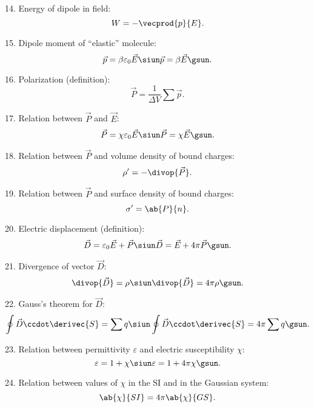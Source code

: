 14. Energy of dipole in field:
\begin{equation*}
	W = - \vecprod{p}{E}.
\end{equation*}

15. Dipole moment of ``elastic'' molecule:
\begin{equation*}
	\vec{p}=\beta\varepsilon_0\vec{E} \siun  \vec{p}=\beta\vec{E} \gsun.
\end{equation*}

16. Polarization (definition):
\begin{equation*}
	\vec{P} = \frac{1}{\Delta{V}}\sum{\vec{p}}.
\end{equation*}

17. Relation between $\vec{P}$ and $\vec{E}$:
\begin{equation*}
	\vec{P}=\chi\varepsilon_0\vec{E} \siun \vec{P}=\chi\vec{E} \gsun.
\end{equation*}

18. Relation between $\vec{P}$ and volume density of bound charges:
\begin{equation*}
	\rho' = - \divop{\vec{P}}.
\end{equation*}

19. Relation between $\vec{P}$ and surface density of bound charges:
\begin{equation*}
	\sigma' = \ab{P}{n}.
\end{equation*}

20. Electric displacement (definition):
\begin{equation*}
	\vec{D} = \varepsilon_0\vec{E} + \vec{P} \siun \vec{D} = \vec{E} + 4\pi\vec{P} \gsun.
\end{equation*}

21. Divergence of vector $\vec{D}$:
\begin{equation*}
	\divop{\vec{D}}=\rho \siun \divop{\vec{D}}=4\pi\rho \gsun.
\end{equation*}

22. Gauss's theorem for $\vec{D}$:
\begin{equation*}
	\oint \vec{D}\ccdot\derivec{S}=\sum q \siun \oint \vec{D}\ccdot\derivec{S}=4\pi\sum q \gsun.
\end{equation*}

23. Relation between permittivity $\varepsilon$ and electric susceptibility $\chi$:
\begin{equation*}
	\varepsilon = 1+\chi \siun \varepsilon = 1+4\pi\chi \gsun.
\end{equation*}

24. Relation between values of $\chi$ in the SI and in the Gaussian system:
\begin{equation*}
	\ab{\chi}{SI} = 4\pi\ab{\chi}{GS}.
\end{equation*}

